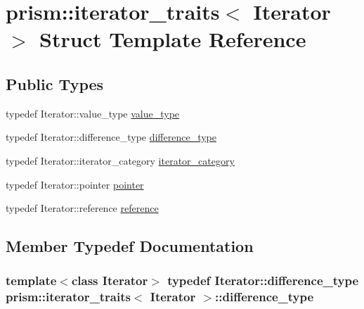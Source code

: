 \hypertarget{structprism_1_1iterator__traits}{}\section{prism\+:\+:iterator\+\_\+traits$<$ Iterator $>$ Struct Template Reference}
\label{structprism_1_1iterator__traits}
\subsection*{Public Types}
\begin{DoxyCompactItemize}
\item 
typedef Iterator\+::value\+\_\+type \hyperlink{structprism_1_1iterator__traits_a897219622ddfbb1f94aba0cc575cb30c}{value\+\_\+type}
\item 
typedef Iterator\+::difference\+\_\+type \hyperlink{structprism_1_1iterator__traits_ae78f6fab069fd9118d558db5d4f81d54}{difference\+\_\+type}
\item 
typedef Iterator\+::iterator\+\_\+category \hyperlink{structprism_1_1iterator__traits_a3ae4da59bd72e7026c5fe2a23e799e1b}{iterator\+\_\+category}
\item 
typedef Iterator\+::pointer \hyperlink{structprism_1_1iterator__traits_a74c12fd61a29bfd2a645a8d798e93810}{pointer}
\item 
typedef Iterator\+::reference \hyperlink{structprism_1_1iterator__traits_a18c26ae6eea81bdaeb3bd4e15038eca7}{reference}
\end{DoxyCompactItemize}


\subsection{Member Typedef Documentation}
\subsubsection[{\texorpdfstring{difference\+\_\+type}{difference_type}}]{\setlength{\rightskip}{0pt plus 5cm}template$<$class Iterator$>$ typedef Iterator\+::difference\+\_\+type {\bf prism\+::iterator\+\_\+traits}$<$ Iterator $>$\+::{\bf difference\+\_\+type}}\hypertarget{structprism_1_1iterator__traits_ae78f6fab069fd9118d558db5d4f81d54}{}\label{structprism_1_1iterator__traits_ae78f6fab069fd9118d558db5d4f81d54}
